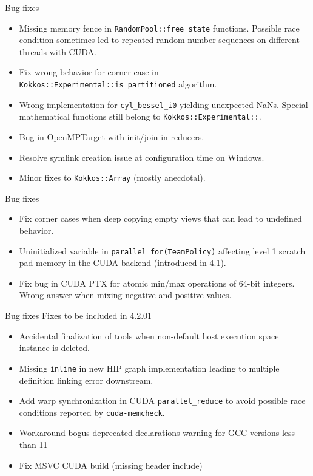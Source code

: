 \begin{frame}[fragile]{Bug fixes}
\begin{itemize}
\item Missing memory fence in \texttt{RandomPool::free\_state} functions.
      Possible race condition sometimes led to repeated random number
      sequences on different threads with CUDA.
\item Fix wrong behavior for corner case in
      \texttt{Kokkos::Experimental::is\_partitioned} algorithm.
\item Wrong implementation for \texttt{cyl\_bessel\_i0} yielding unexpected
      NaNs. Special mathematical functions still belong to
      \texttt{Kokkos::Experimental::}.
\item Bug in OpenMPTarget with init/join in reducers.
\item Resolve symlink creation issue at configuration time on Windows.
\item Minor fixes to \texttt{Kokkos::Array} (mostly anecdotal).
\end{itemize}
\end{frame}

\begin{frame}[fragile]{Bug fixes}
\begin{itemize}
\item Fix corner cases when deep copying empty views that can lead to
      undefined behavior.
\item Uninitialized variable in \texttt{parallel\_for(TeamPolicy)} affecting
      level 1 scratch pad memory in the CUDA backend (introduced in 4.1).
\item Fix bug in CUDA PTX for atomic min/max operations of 64-bit integers.
      Wrong answer when mixing negative and positive values.
\end{itemize}
\end{frame}

\begin{frame}[fragile]{Bug fixes}
Fixes to be included in 4.2.01
\begin{itemize}
\item Accidental finalization of tools when non-default host execution space
      instance is deleted.
\item Missing \texttt{inline} in new HIP graph implementation leading to
      multiple definition linking error downstream.
\item Add warp synchronization in CUDA \texttt{parallel\_reduce} to avoid
      possible race conditions reported by \texttt{cuda-memcheck}.
\item Workaround bogus deprecated declarations warning for GCC versions less than 11
\item Fix MSVC CUDA build (missing header include)
\end{itemize}
\end{frame}


